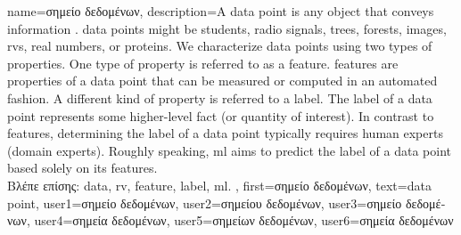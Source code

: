 {name={\foreignlanguage{greek}{σημείο δεδομένων}},
description={A \gls{data} point is any object that conveys information \cite{coverthomas}. \Gls{data} points might be 
		students, radio signals, trees, forests, images, \gls{rv}s, real numbers, or proteins. We characterize \gls{data} points 
		using two types of properties. One type of property is referred to as a \gls{feature}. \Gls{feature}s are properties of a 
		\gls{data} point that can be measured or computed in an automated fashion. 
		A different kind of property is referred to a \gls{label}. The \gls{label} of 
		a \gls{data} point represents some higher-level fact (or quantity of interest). In 
		contrast to \gls{feature}s, determining the \gls{label} of a \gls{data} point typically 
		requires human experts (domain experts). Roughly speaking, \gls{ml} aims to predict 
		the \gls{label} of a \gls{data} point based solely on its \gls{feature}s.\\
		\foreignlanguage{greek}{Βλέπε επίσης:} \gls{data}, \gls{rv}, \gls{feature}, \gls{label}, \gls{ml}.
		}, 
		first={\foreignlanguage{greek}{σημείο δεδομένων}},
		text={data point},
		user1={\foreignlanguage{greek}{σημείο δεδομένων}}, %
		user2={\foreignlanguage{greek}{σημείου δεδομένων}}, %
		user3={\foreignlanguage{greek}{σημείο δεδομένων}}, %
		user4={\foreignlanguage{greek}{σημεία δεδομένων}}, %
		user5={\foreignlanguage{greek}{σημείων δεδομένων}}, %
		user6={\foreignlanguage{greek}{σημεία δεδομένων}} %
}


